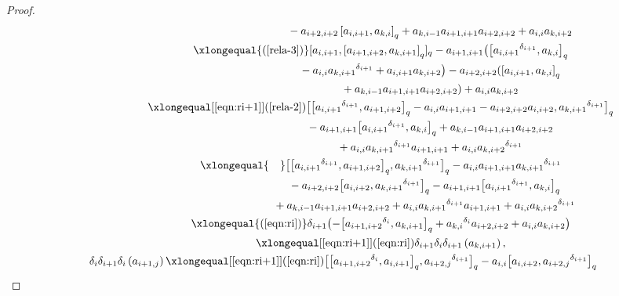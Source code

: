 \documentclass[pdftex]{sigma}
\numberwithin{equation}{section}
\def\lr#1{\left[#1\right]}
\def\lrb#1{\left(#1\right)}
\def\d{\delta}
\begin{document}
\begin{proof}
\begin{gather*}
 \phantom{ \d_i\d_{i+1}\d_i\lrb{a_{k,i+1}}\xlongequal{\qquad} }{} -a_{i+2,i+2}\lr{a_{i,i+1}, a_{k,i}}_q +a_{k,i-1}a_{i+1,i+1}a_{i+2,i+2} +a_{i,i}a_{k,i+2}\\
 \phantom{ \d_i\d_{i+1}\d_i\lrb{a_{k,i+1}} }{} \xlongequal{\lrb{\ref{rela-3}}} [a_{i,i+1},\lr{a_{i+1,i+2}, a_{k,i+1}}_q]_q -a_{i+1,i+1} \bigl(\bigl[{a_{i,i+1}}^{\d_{i+1}}, a_{k,i}\bigr]_q \\
 \phantom{ \d_i\d_{i+1}\d_i\lrb{a_{k,i+1}}\xlongequal{\qquad} }{} -a_{i,i} {a_{k,i+1}}^{\d_{i+1}} +a_{i,i+1}a_{k,i+2} \bigr) -a_{i+2,i+2}(\lr{a_{i,i+1}, a_{k,i}}_q \\
 \phantom{ \d_i\d_{i+1}\d_i\lrb{a_{k,i+1}}\xlongequal{\qquad} }{}+a_{k,i-1}a_{i+1,i+1}a_{i+2,i+2}) +a_{i,i}a_{k,i+2}\\
 \phantom{ \d_i\d_{i+1}\d_i\lrb{a_{k,i+1}}}{} \xlongequal[\eqref{eqn:ri+1}]{\lrb{\ref{rela-2}}} \bigl[\bigl[{a_{i,i+1}}^{\d_{i+1}}, a_{i+1,i+2}\bigr]_q-a_{i,i}a_{i+1,i+1} -a_{i+2,i+2}a_{i,i+2}, {a_{k,i+1}}^{\d_{i+1}}\bigr]_q \\
 \phantom{ \d_i\d_{i+1}\d_i\lrb{a_{k,i+1}}\xlongequal{\qquad} }{} -a_{i+1,i+1}\bigl[{a_{i,i+1}}^{\d_{i+1}},a_{k,i}\bigr]_q+a_{k,i-1}a_{i+1,i+1}a_{i+2,i+2} \\
 \phantom{ \d_i\d_{i+1}\d_i\lrb{a_{k,i+1}}\xlongequal{\qquad} }{} +a_{i,i}{a_{k,i+1}}^{\d_{i+1}}a_{i+1,i+1}+a_{i,i}{a_{k,i+2}}^{\d_{i+1}}\\
 \phantom{ \d_i\d_{i+1}\d_i\lrb{a_{k,i+1}}}{} \xlongequal{\quad} \bigl[\bigl[{a_{i,i+1}}^{\d_{i+1}}, a_{i+1,i+2}\bigr]_q, {a_{k,i+1}}^{\d_{i+1}}\bigr]_q -a_{i,i}a_{i+1,i+1}{a_{k,i+1}}^{\d_{i+1}} \\
 \phantom{ \d_i\d_{i+1}\d_i\lrb{a_{k,i+1}}\xlongequal{\quad} }{} -a_{i+2,i+2} \bigl[a_{i,i+2}, {a_{k,i+1}}^{\d_{i+1}} \bigr]_q -a_{i+1,i+1} \bigl[{a_{i,i+1}}^{\d_{i+1}}, a_{k,i} \bigr]_q \\
 \phantom{ \d_i\d_{i+1}\d_i\lrb{a_{k,i+1}}\xlongequal{\quad} }{} +a_{k,i-1}a_{i+1,i+1}a_{i+2,i+2} +a_{i,i}{a_{k,i+1}}^{\d_{i+1}} a_{i+1,i+1}+a_{i,i}{a_{k,i+2}}^{\d_{i+1}}\\
 \phantom{ \d_i\d_{i+1}\d_i\lrb{a_{k,i+1}} }{} \xlongequal{\lrb{\ref{eqn:ri}}} \d_{i+1}\bigl(-\bigl[{a_{i+1,i+2}}^{\d_{i}}, a_{k,i+1}\bigr]_q+{a_{k,i}}^{\d_{i}}a_{i+2,i+2} +a_{i,i}a_{k,i+2}\bigr)\\
 \phantom{ \d_i\d_{i+1}\d_i\lrb{a_{k,i+1}} }{} \xlongequal[\eqref{eqn:ri+1}]{\lrb{\ref{eqn:ri}}} \d_{i+1}\d_i\d_{i+1}\lrb{a_{k,i+1}},
 \\
 \d_i\d_{i+1}\d_i\lrb{a_{i+1,j}}
\xlongequal[\eqref{eqn:ri+1}]{\lrb{\ref{eqn:ri}}} \bigl[\bigl[ {a_{i+1,i+2}}^{\d_{i}}, a_{i,i+1}\bigr]_q,{a_{i+2,j}}^{\d_{i+1}}\bigr]_q -a_{i,i}\bigl[a_{i,i+2}, {a_{i+2,j}}^{\d_{i+1}}\bigr]_q \\

\end{gather*}
\end{proof}
\end{document}
